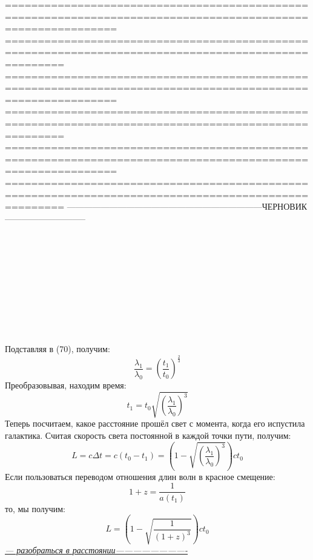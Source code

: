 \documentclass{article}
\newcommand{\ttt}[1]{\underline{\textit{#1}}}
\newcommand{\eq}[1]{\begin{equation} #1 \end{equation}}
\begin{document}
=============================================================================================================
=====================================================================================================
=============================================================================================================
=====================================================================================================
=============================================================================================================
=====================================================================================================
---------------------------------------------------------------------ЧЕРНОВИК-----------------------------
\\\\\\\\\\\\\\\\\\\\
\\Подставляя в (70), получим:
\eq{\frac{\lambda_1}{\lambda_0}=\left(\frac{t_1}{t_0}  \right)^{\frac{2}{3}}}
Преобразовывая, находим время:
\eq{t_1 =t_0 \sqrt{\left( \frac{\lambda_1}{\lambda_0} \right)^3} }
Теперь посчитаем, какое расстояние прошёл свет с момента, когда его испустила галактика. 
Считая скорость света постоянной в каждой точки пути, получим:
\eq{L = c \Delta t = c\left( t_0 - t_1 \right)=\left( 1 - \sqrt{\left( \frac{\lambda_1}{\lambda_0} \right)^3} \right)ct_0}
Если пользоваться переводом отношения длин волн в красное смещение:
\eq{1+z = \frac{1}{a(t_1)}}
то, мы получим:
\eq{L = \left(1-\sqrt{\frac{1}{(1+z)^3}}\right)ct_0}
\ttt{--- разобраться в расстоянии-------------------------}

\newpage
\end{document}
